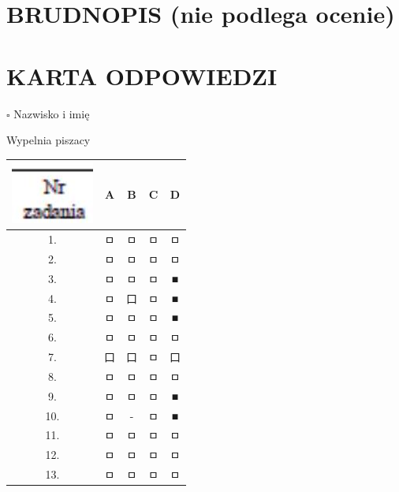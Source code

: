 \documentclass[10pt]{article}
\begin{document}
\section*{BRUDNOPIS (nie podlega ocenie)}
\section*{KARTA ODPOWIEDZI}
\(\square\) Nazwisko i imię

Wypelnia piszacy

\begin{center}
\begin{tabular}{|c|c|c|c|c|}
\hline
\includegraphics[max width=\textwidth]{2024_11_21_fb7e622176e162773107g-16}
 & A & B & C & D \\
\hline
1. & ㅁ & ㅁ & ㅁ & ㅁ \\
\hline
2. & ㅁ & ㅁ & ㅁ & ㅁ \\
\hline
3. & ㅁ & ㅁ & ㅁ & ■ \\
\hline
4. & ㅁ & 口 & ㅁ & ■ \\
\hline
5. & ㅁ & ㅁ & ㅁ & ■ \\
\hline
6. & ㅁ & ㅁ & ㅁ & ㅁ \\
\hline
7. & 口 & 口 & ㅁ & 口 \\
\hline
8. & ㅁ & ㅁ & ㅁ & ㅁ \\
\hline
9. & ㅁ & ㅁ & ㅁ & ■ \\
\hline
10. & ㅁ & - & ㅁ & ■ \\
\hline
11. & ㅁ & ㅁ & ㅁ & ㅁ \\
\hline
12. & ㅁ & ㅁ & ㅁ & ㅁ \\
\hline
13. & ㅁ & ㅁ & ㅁ & ㅁ \\

\end{tabular}
\end{center}
\end{document}
